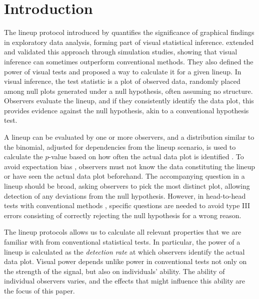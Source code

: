 \documentclass[10pt]{article}\usepackage[]{graphicx}\usepackage[]{xcolor}
\begin{document}
\section{Introduction}  

The lineup protocol introduced by \citet{buja:2009} quantifies the significance of graphical findings in exploratory data analysis, forming part of visual statistical inference. \citet{majumder:2013} extended and validated this approach through simulation studies, showing that visual inference can sometimes outperform conventional methods. They also defined the power of visual tests and proposed a way to calculate it for a given lineup. In visual inference, the test statistic is a plot of observed data, randomly placed among null plots generated under a null hypothesis, often assuming no structure. Observers evaluate the lineup, and if they consistently identify the data plot, this provides evidence against the null hypothesis, akin to a conventional hypothesis test.

A lineup can be evaluated by one or more observers, and a distribution similar to the binomial, adjusted for dependencies from the lineup scenario, is used to calculate the $p$-value based on how often the actual data plot is identified \citep{vinference}. To avoid expectation bias \citep{meilgaard}, observers must not know the data constituting the lineup or have seen the actual data plot beforehand. The accompanying question in a lineup should be broad, asking observers to pick the most distinct plot, allowing detection of any deviations from the null hypothesis. However, in head-to-head tests with conventional methods \citep{majumder:2013, tengfei:2013}, specific questions are needed to avoid type III errors \citep{mosteller:48} consisting of correctly rejecting the null hypothesis for a wrong reason.

The lineup protocols allows us to calculate all relevant properties that we are familiar with from conventional statistical tests. In particular, the power of a lineup is calculated as the {\it detection rate} at which observers identify the actual data plot. Visual power depends unlike power in conventional tests not only on the strength of the signal, but also on individuals' ability. The ability of individual observers varies, and the effects that might influence this ability are the focus of this paper.
\end{document}
